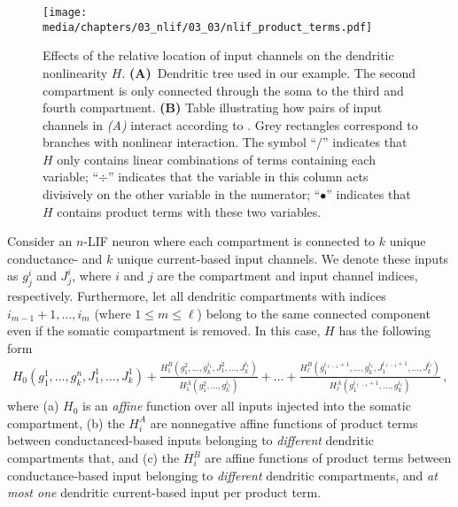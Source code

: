 \begin{figure}
	\centering
	\texttt{[image: media/chapters/03\_nlif/03\_03/nlif\_product\_terms.pdf]}
	\caption[Effects of the relative location of input channels on the dendritic nonlinearity $H$]{Effects of the relative location of input channels on the dendritic nonlinearity $H$. \textbf{(A)}~Dendritic tree used in our example.
	The second compartment is only connected through the soma to the third and fourth compartment.
	\textbf{(B)} Table illustrating how pairs of input channels in \emph{(A)} interact according to .
	Grey rectangles correspond to branches with nonlinear interaction.
	The symbol \enquote{$/$} indicates that $H$ only contains linear combinations of terms containing each variable; \enquote{$\div$} indicates that the variable in this column acts divisively on the other variable in the numerator; \enquote{$\bullet$} indicates that $H$ contains product terms with these two variables.}
	\label{fig:nlif_product_terms}
\end{figure}

\begin{theorem}
\label{thm:nlif_product_terms}
Consider an $n$-LIF neuron where each compartment is connected to $k$ unique con\-duc\-tance- and $k$ unique current-based input channels.
We denote these inputs as $g_j^i$ and $J_j^i$, where $i$ and $j$ are the compartment and input channel indices, respectively.
Furthermore, let all dendritic compartments with indices $i_{m - 1} + 1, \ldots, i_{m}$ (where $1 \leq m \leq \ell$) belong to the same connected component even if the somatic compartment is removed.
In this case, $H$ has the following form
\begin{align}
	H_0(g_1^1, \ldots, g_k^n, J_1^1, \ldots, J_k^1) +
	\frac{H^B_1(
		g_1^{2}, \ldots, g_k^{i_1} \!,
		J_1^{2}, \ldots, J_k^{i_1})
	}{
		H^A_1(g_1^{2}, \ldots, g_k^{i_1})
	}
	+ \ldots +
	\frac{H^B_\ell(
		g_1^{i_{\ell - 1} + 1}, \ldots, g_k^{i_\ell},
		J_1^{i_{\ell - 1} + 1}, \ldots, J_k^{i_\ell})
	}{
		H^A_\ell(g_1^{i_{\ell - 1} + 1}, \ldots, g_k^{i_\ell})
	} \,,
	\label{eqn:nlif_product_terms}
\end{align}
where (a) $H_0$ is an \emph{affine} function over all inputs injected into the somatic compartment, (b) the $H^A_i$ are nonnegative affine functions of product terms between conductanced-based inputs belonging to \emph{different} dendritic compartments that, and (c) the $H^B_i$ are affine functions of product terms between conductance-based input belonging to \emph{different} dendritic compartments, and \emph{at most one} dendritic current-based input per product term.
\end{theorem}

